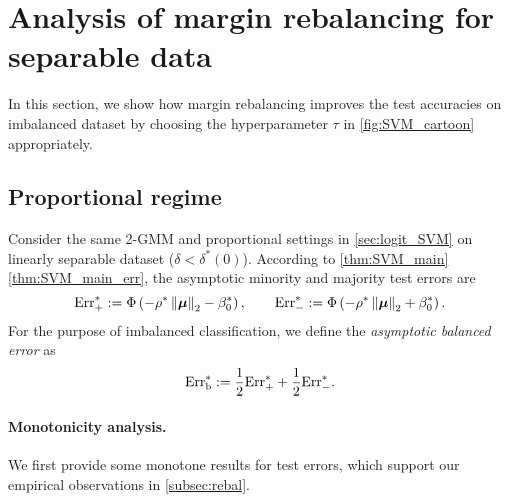 \section{Analysis of margin rebalancing for separable data} \label{sec:rebalacing}


In this section, we show how margin rebalancing improves the test accuracies on imbalanced dataset by choosing the hyperparameter $\tau$ in \cref{fig:SVM_cartoon} appropriately. 


\subsection{Proportional regime}
\label{subsec:rebal_prop}
Consider the same 2-GMM and proportional settings in \cref{sec:logit_SVM} on linearly separable dataset ($\delta < \delta^*(0)$). According to \cref{thm:SVM_main}\ref{thm:SVM_main_err}, the asymptotic minority and majority test errors are
\begin{equation}\label{eq:asymp_Err}
    \mathrm{Err}_{+}^*  :=  \Phi \left(- \rho^* \left\|{\text{\boldmath $\mu$}}\right\|_2 - \beta_0^* \right),
            \qquad
    \mathrm{Err}_{-}^*  :=  \Phi \left(- \rho^* \left\|{\text{\boldmath $\mu$}}\right\|_2  + \beta_0^* \right).
\end{equation}
For the purpose of imbalanced classification, we define the \textit{asymptotic balanced error} as
\begin{equation*}
\mathrm{Err}_\mathrm{b}^* := \frac{1}{2} \mathrm{Err}_{+}^* + \frac{1}{2} \mathrm{Err}_{-}^*.
\end{equation*}

\paragraph{Monotonicity analysis.} 
We first provide some monotone results for test errors, which support our empirical observations in \cref{subsec:rebal}. 




